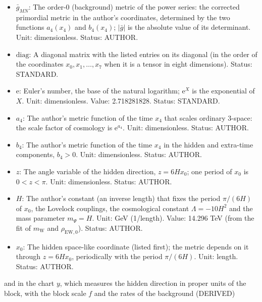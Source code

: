 \documentclass[
  10pt,
]{article}
\providecommand{\tightlist}{%
  \setlength{\itemsep}{0pt}\setlength{\parskip}{0pt}}
\begin{document}
\begin{itemize}
\tightlist
\item
  \(\bar g_{MN}\): The order-0 (background) metric of the power series:
  the corrected primordial metric in the author's coordinates,
  determined by the two functions \(a_4(x_4)\) and \(b_4(x_4)\);
  \(\lvert\bar g\rvert\) is the absolute value of its determinant. Unit:
  dimensionless. Status: AUTHOR.
\item
  \(\mathrm{diag}\): A diagonal matrix with the listed entries on its
  diagonal (in the order of the coordinates \(x_0, x_1, \dots, x_7\)
  when it is a tensor in eight dimensions). Status: STANDARD.
\item
  \(\mathrm{e}\): Euler's number, the base of the natural logarithm;
  \(\mathrm{e}^{X}\) is the exponential of \(X\). Unit: dimensionless.
  Value: 2.718281828. Status: STANDARD.
\item
  \(a_4\): The author's metric function of the time \(x_4\) that scales
  ordinary 3-space: the scale factor of cosmology is
  \(\mathrm{e}^{a_4}\). Unit: dimensionless. Status: AUTHOR.
\item
  \(b_4\): The author's metric function of the time \(x_4\) in the
  hidden and extra-time components, \(b_4 > 0\). Unit: dimensionless.
  Status: AUTHOR.
\item
  \(z\): The angle variable of the hidden direction, \(z = 6Hx_0\); one
  period of \(x_0\) is \(0 < z < \pi\). Unit: dimensionless. Status:
  AUTHOR.
\item
  \(H\): The author's constant (an inverse length) that fixes the period
  \(\pi/(6H)\) of \(x_0\), the Lovelock couplings, the cosmological
  constant \(\Lambda = -10H^2\) and the mass parameter \(m_\Psi = H\).
  Unit: GeV (1/length). Value: 14.296 TeV (from the fit of
  \(m_{\mathrm{W}}\) and \(\rho_{\mathrm{EW},0}\)). Status: AUTHOR.
\item
  \(x_0\): The hidden space-like coordinate (listed first); the metric
  depends on it through \(z = 6Hx_0\), periodically with the period
  \(\pi/(6H)\). Unit: length. Status: AUTHOR.
\end{itemize}

and in the chart \(y\), which measures the hidden direction in proper
units of the block, with the block scale \(f\) and the rates of the
background (DERIVED)
\end{document}
